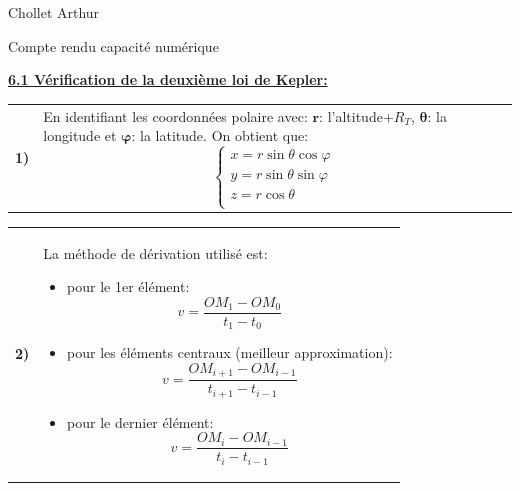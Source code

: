 \documentclass{article}
\newcommand{\expart}[1]
{
    \textbf{\underline{#1:}} \par 
}
\newcommand{\question}[2]
{
    \begin{tabularx}{\linewidth}{lX}
        \textbf{#1)} & {#2}
    \end{tabularx} 
}
\begin{document}
Chollet Arthur

\begin{center}
    \Huge
    \normalfont\calligra Compte rendu capacité numérique
\end{center}

\expart{6.1 Vérification de la deuxième loi de Kepler}

\question{1}{
  En identifiant les coordonnées polaire avec: $\boldsymbol{r}$: l'altitude+$R_T$, $\boldsymbol{\theta}$: la longitude et $\boldsymbol{\varphi}$: la latitude. On obtient que:
  $$
  \boxed{\begin{cases}
    x=r\sin\theta\cos\varphi\\
    y=r\sin\theta\sin\varphi\\
    z=r\cos\theta\\
  \end{cases}}
  $$
}

\question{2}{
  La méthode de dérivation utilisé est:
  \begin{itemize}
    \item pour le 1er élément:
    $$
      v=\frac{OM_1-OM_0}{t_{1}-t_{0}}
    $$
    \item pour les éléments centraux (meilleur approximation):
    $$
      v=\frac{OM_{i+1}-OM_{i-1}}{t_{i+1}-t_{i-1}}
    $$
    \item pour le dernier élément:
    $$
      v=\frac{OM_{i}-OM_{i-1}}{t_{i}-t_{i-1}}
    $$
  \end{itemize}
}
\end{document}
